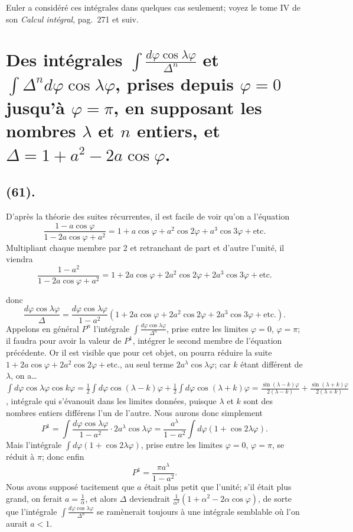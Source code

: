 \documentclass{article}
\begin{document}
Euler a considéré ces intégrales dans quelques cas seulement; voyez le tome IV de son \emph{Calcul intégral}, pag.~271 et suiv.

\section*{Des intégrales $\displaystyle\int\frac{d\varphi\cos\lambda\varphi}{\Delta^{n}}$ et $\displaystyle\int\Delta^{n}d\varphi\cos\lambda\varphi$, prises depuis $\varphi=0$ jusqu'à $\varphi=\pi$, en supposant les nombres $\lambda$ et $n$ entiers, et $\Delta=1+a^{2}-2a\cos\varphi$.}

\subsection*{(61).}

D'après la théorie des suites récurrentes, il est facile de voir qu'on a l'équation
\[ \frac{1-a\cos\varphi}{1-2a\cos\varphi+a^{2}}=1+a\cos\varphi+a^{2}\cos2\varphi+a^{3}\cos3\varphi+\text{etc.} \]
Multipliant chaque membre par 2 et retranchant de part et d'autre l'unité, il viendra
\[ \frac{1-a^{2}}{1-2a\cos\varphi+a^{2}}=1+2a\cos\varphi+2a^{2}\cos2\varphi+2a^{3}\cos3\varphi+\text{etc.} \]

donc
\[ \frac{d\varphi\cos\lambda\varphi}{\Delta}=\frac{d\varphi\cos\lambda\varphi}{1-a^{2}}(1+2a\cos\varphi+2a^{2}\cos2\varphi+2a^{3}\cos3\varphi+\text{etc.}). \]
Appelons en général $P^{n}$ l'intégrale $\displaystyle\int\frac{d\varphi\cos\lambda\varphi}{\Delta^{n}}$, prise entre les limites $\varphi=0$, $\varphi=\pi$; il faudra pour avoir la valeur de $P^{1}$, intégrer le second membre de l'équation précédente. Or il est visible que pour cet objet, on pourra réduire la suite $1+2a\cos\varphi+2a^{2}\cos2\varphi+\text{etc.}$, au seul terme $2a^{\lambda}\cos\lambda\varphi$; car $k$ étant différent de $\lambda$, on a\ldots\ $\displaystyle\int d\varphi\cos\lambda\varphi\cos k\varphi=\frac{1}{2}\int d\varphi\cos(\lambda-k)\varphi+\frac{1}{2}\int d\varphi\cos(\lambda+k)\varphi=\frac{\sin(\lambda-k)\varphi}{2(\lambda-k)}+\frac{\sin(\lambda+k)\varphi}{2(\lambda+k)}$, intégrale qui s'évanouit dans les limites données, puisque $\lambda$ et $k$ sont des nombres entiers différens l'un de l'autre. Nous aurons donc simplement
\[ P^{1}=\int\frac{d\varphi\cos\lambda\varphi}{1-a^{2}}\cdot2a^{\lambda}\cos\lambda\varphi=\frac{a^{\lambda}}{1-a^{2}}\int d\varphi(1+\cos2\lambda\varphi). \]
Mais l'intégrale $\displaystyle\int d\varphi(1+\cos2\lambda\varphi)$, prise entre les limites $\varphi=0$, $\varphi=\pi$, se réduit à $\pi$; donc enfin
\[ P^{1}=\frac{\pi a^{\lambda}}{1-a^{2}}. \tag{1} \]
Nous avons supposé tacitement que $a$ était plus petit que l'unité; s'il était plus grand, on ferait $a=\frac{1}{\alpha}$, et alors $\Delta$ deviendrait $\frac{1}{\alpha^{2}}(1+\alpha^{2}-2\alpha\cos\varphi)$, de sorte que l'intégrale $\displaystyle\int\frac{d\varphi\cos\lambda\varphi}{\Delta^{n}}$ se ramènerait toujours à une intégrale semblable où l'on aurait $a<1$.
\end{document}
